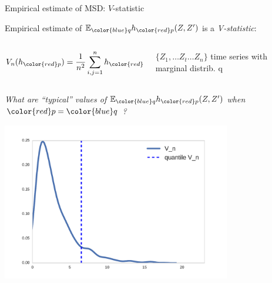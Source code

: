 \documentclass{beamer}
\begin{document}

 
 \begin{frame}{Empirical estimate of MSD: $V$-statistic}

Empirical estimate  of $\ev_{\color{blue} q} h_{\color{red} p}(Z,Z')$ is
a {\em V-statistic}: 
\begin{columns}
        \begin{column}{.5\textwidth}
\[
 V_n(h_{\color{red} p}) = \frac {1} {n^2} \sum_{i,j=1}^n h_{\color{red} p}(Z_i,Z_j),
\]
         \end{column}
        \begin{column}{.5\textwidth}
$\{ Z_1 ,\ldots Z_t \ldots Z_n \}$ time series with marginal distrib.  {\color{blue} q}
        \end{column}
\end{columns}
\pause




 {\large\emph{  What are ``typical'' values of  $\ev_{\color{blue} q} h_{\color{red} p}(Z,Z')$ when ${\color{red} p} = {\color{blue} q}$ ? }}

\vspace{-0.4cm}
\begin{center}
 \includegraphics[width=0.75\textwidth]{./img/nullDistributionCorr.pdf}
\end{center}
 
 \end{frame}
 
\end{document}
